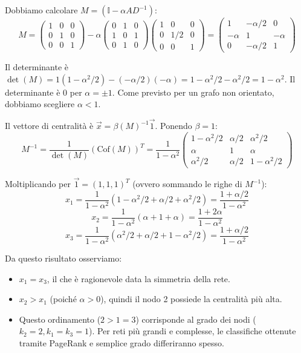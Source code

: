 	Dobbiamo calcolare $M = (\mathbb{I} - \alpha A D^{-1})$:
	$$M = \begin{pmatrix} 1 & 0 & 0 \\ 0 & 1 & 0 \\ 0 & 0 & 1 \end{pmatrix} - \alpha \begin{pmatrix} 0 & 1 & 0 \\ 1 & 0 & 1 \\ 0 & 1 & 0 \end{pmatrix} \begin{pmatrix} 1 & 0 & 0 \\ 0 & 1/2 & 0 \\ 0 & 0 & 1 \end{pmatrix} = \begin{pmatrix} 1 & -\alpha/2 & 0 \\ -\alpha & 1 & -\alpha \\ 0 & -\alpha/2 & 1 \end{pmatrix}$$
	
	Il determinante è $\det(M) = 1(1 - \alpha^2/2) - (-\alpha/2)(-\alpha) = 1 - \alpha^2/2 - \alpha^2/2 = 1 - \alpha^2$.
	Il determinante è 0 per $\alpha = \pm 1$. Come previsto per un grafo non orientato, dobbiamo scegliere $\alpha < 1$.
	
	Il vettore di centralità è $\vec{x} = \beta (M)^{-1} \vec{1}$. Ponendo $\beta=1$:
	$$M^{-1} = \frac{1}{\det(M)} (\text{Cof}(M))^T = \frac{1}{1-\alpha^2} \begin{pmatrix} 1-\alpha^2/2 & \alpha/2 & \alpha^2/2 \\ \alpha & 1 & \alpha \\ \alpha^2/2 & \alpha/2 & 1-\alpha^2/2 \end{pmatrix}$$
	
	Moltiplicando per $\vec{1} = (1, 1, 1)^T$ (ovvero sommando le righe di $M^{-1}$):
	$$x_1 = \frac{1}{1-\alpha^2} (1 - \alpha^2/2 + \alpha/2 + \alpha^2/2) = \frac{1 + \alpha/2}{1 - \alpha^2}$$
	$$x_2 = \frac{1}{1-\alpha^2} (\alpha + 1 + \alpha) = \frac{1 + 2\alpha}{1 - \alpha^2}$$
	$$x_3 = \frac{1}{1-\alpha^2} (\alpha^2/2 + \alpha/2 + 1 - \alpha^2/2) = \frac{1 + \alpha/2}{1 - \alpha^2}$$
	
	Da questo risultato osserviamo:
	\begin{itemize}
		\item $x_1 = x_3$, il che è ragionevole data la simmetria della rete.
		\item $x_2 > x_1$ (poiché $\alpha > 0$), quindi il nodo 2 possiede la centralità più alta.
		\item Questo ordinamento ($2 > 1 = 3$) corrisponde al grado dei nodi ($k_2=2, k_1=k_3=1$). Per reti più grandi e complesse, le classifiche ottenute tramite PageRank e semplice grado differiranno spesso.
	\end{itemize}

